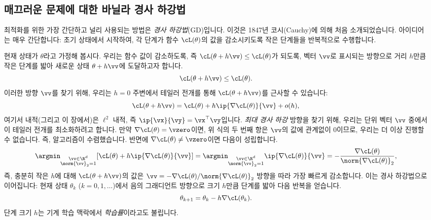\documentclass[../../book-main_ko.tex]{subfiles}
\begin{document}
\subsection{매끄러운 문제에 대한 바닐라 경사 하강법}

최적화를 위한 가장 간단하고 널리 사용되는 방법은 \textit{경사 하강법}(GD)입니다. 이것은 1847년 코시(Cauchy)에 의해 처음 소개되었습니다. 아이디어는 매우 간단합니다: 초기 상태에서 시작하여, 각 단계가 함수 \(\cL(\theta)\)의 값을 감소시키도록 작은 단계들을 반복적으로 수행합니다. 

현재 상태가 \(\theta\)라고 가정해 봅시다. 우리는 함수 값이 감소하도록, 즉 \(\cL(\theta + h\vv) \leq \cL(\theta)\)가 되도록, 벡터 \(\vv\)로 표시되는 방향으로 거리 \(h\)만큼 작은 단계를 밟아 새로운 상태 \(\theta + h\vv\)에 도달하고자 합니다.
\begin{equation}
    \cL(\theta + h\vv) \leq \cL(\theta).
\end{equation}
이러한 방향 \(\vv\)를 찾기 위해, 우리는 \(h = 0\) 주변에서 테일러 전개를 통해 \(\cL(\theta + h\vv)\)를 근사할 수 있습니다:
\begin{equation}
    \cL(\theta + h\vv) = \cL(\theta) + h\ip{\nabla \cL(\theta)}{\vv} + o(h),
\end{equation}
여기서 내적(그리고 이 장에서)은 \(\ell^{2}\) 내적, 즉 \(\ip{\vx}{\vy} = \vx^{\top}\vy\)입니다. \textit{최대 경사 하강} 방향을 찾기 위해, 우리는 단위 벡터 \(\vv\) 중에서 이 테일러 전개를 최소화하려고 합니다. 만약 \(\nabla \cL(\theta) = \vzero\)이면, 위 식의 두 번째 항은 \(\vv\)의 값에 관계없이 \(0\)이므로, 우리는 더 이상 진행할 수 없습니다. 즉, 알고리즘이 수렴했습니다. 반면에 \(\nabla \cL(\theta) \neq \vzero\)이면 다음이 성립합니다.
\begin{equation}\label{eq:steepest_descent_l2_norm}
    \argmin_{\substack{\vv \in \R^{d} \\ \norm{\vv}_{2} = 1}} [\cL(\theta) + h\ip{\nabla \cL(\theta)}{\vv}] = \argmin_{\substack{\vv \in \R^{d} \\ \norm{\vv}_{2} = 1}} \ip{\nabla \cL(\theta)}{\vv} = -\frac{\nabla \cL(\theta)}{\norm{\nabla \cL(\theta)}_{2}},
\end{equation}
즉, 충분히 작은 \(h\)에 대해 \(\cL(\theta + h\vv)\)의 값은 \(\vv = -\nabla \cL(\theta) / \norm{\nabla \cL(\theta)}_{2}\) 방향을 따라 가장 빠르게 감소합니다. 이는 경사 하강법으로 이어집니다: 현재 상태 \(\theta_{k}\) (\(k=0, 1, \ldots\))에서 음의 그래디언트 방향으로 크기 \(h\)만큼 단계를 밟아 다음 반복을 얻습니다.
\begin{equation}
    \theta_{k+1} = \theta_{k} - h \nabla \cL(\theta_{k}). 
\end{equation}
단계 크기 \(h\)는 기계 학습 맥락에서 \textit{학습률}이라고도 불립니다.
\end{document}
